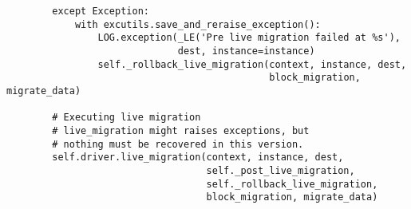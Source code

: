 \documentclass[a4paper,left=1.5cm,right=1.5cm,11pt]{article}
\begin{document}
\begin{lstlisting}
        except Exception:
            with excutils.save_and_reraise_exception():
                LOG.exception(_LE('Pre live migration failed at %s'),
                              dest, instance=instance)
                self._rollback_live_migration(context, instance, dest,
                                              block_migration, migrate_data)

        # Executing live migration
        # live_migration might raises exceptions, but
        # nothing must be recovered in this version.
        self.driver.live_migration(context, instance, dest,
                                   self._post_live_migration,
                                   self._rollback_live_migration,
                                   block_migration, migrate_data)
    \end{lstlisting}
\end{document}
